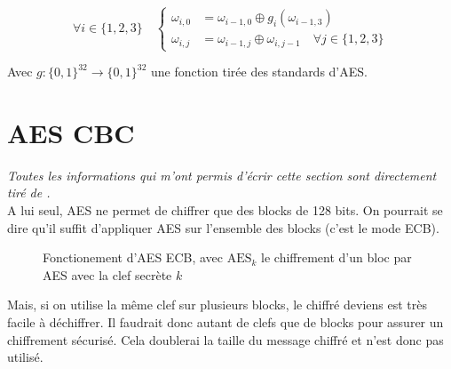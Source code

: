 \documentclass[a4paper, 12pt]{article}
\begin{document}
$$
\forall i \in \{1,2,3\} \quad 
\begin{cases}
	\omega_{i,0} &= \omega_{i-1,0} \oplus g_i(\omega_{i-1,3}) \\
	\omega_{i,j} &= \omega_{i-1,j} \oplus \omega_{i,j-1} \quad \forall j \in \{1,2,3\} 
\end{cases}
$$

\noindent Avec $g: \{0,1\}^{32} \rightarrow \{0,1\}^{32}$ une fonction tirée des standards d'AES.

\section{AES CBC}\label{sectioncbc}
\noindent\emph{Toutes les informations qui m'ont permis d'écrir cette section sont directement tiré de \cite{courscourt}.}\\

A lui seul, AES ne permet de chiffrer que des blocks de 128 bits. On pourrait se dire qu'il suffit d'appliquer AES sur l'ensemble des blocks (c'est le mode ECB). 

\begin{figure}[h]
\centering
{}
\caption{Fonctionement d'AES ECB, avec $\text{AES}_k$ le chiffrement d'un bloc par AES avec la clef secrète $k$}
\label{ilu_ECB}
\end{figure}

Mais, si on utilise la même clef sur plusieurs blocks, le chiffré deviens est très facile à déchiffrer. Il faudrait donc autant de clefs que de blocks pour assurer un chiffrement sécurisé. Cela doublerai la taille du message chiffré et n'est donc pas utilisé. \\
\end{document}
